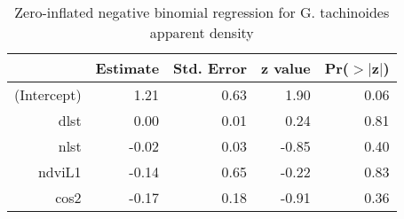 \begin{table}[ht]
\centering
\caption{Zero-inflated negative binomial regression for G. tachinoides apparent density} 
\label{tab:gtdapfit}
\begin{tabular}{rrrrr}
  \hline
 & Estimate & Std. Error & z value & Pr($>$$|$z$|$) \\ 
  \hline
(Intercept) & 1.21 & 0.63 & 1.90 & 0.06 \\ 
  dlst & 0.00 & 0.01 & 0.24 & 0.81 \\ 
  nlst & -0.02 & 0.03 & -0.85 & 0.40 \\ 
  ndviL1 & -0.14 & 0.65 & -0.22 & 0.83 \\ 
  cos2 & -0.17 & 0.18 & -0.91 & 0.36 \\ 
   \hline
\end{tabular}
\end{table}
